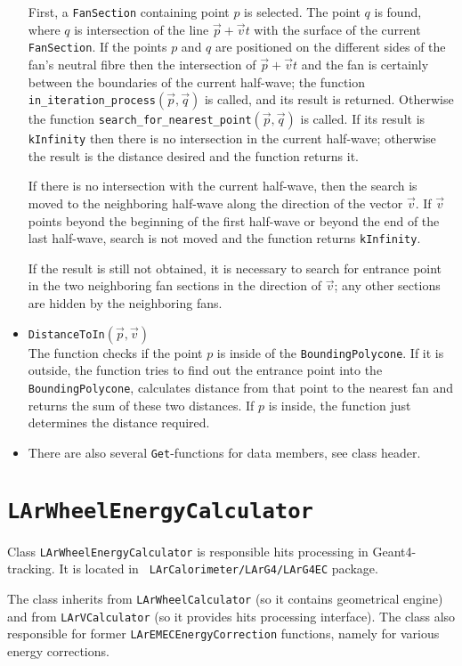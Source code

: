 \documentclass{article}
\begin{document}
\begin{itemize}
First, a {\tt FanSection} containing point $p$ is selected. The point $q$ is
found, where $q$ is intersection of the line $\vec{p}+\vec{v}t$ 
with the surface of the current {\tt FanSection}. If the points $p$
and $q$ are positioned on the different sides of the fan's neutral fibre
then the intersection of $\vec{p}+\vec{v}t$
and the fan is certainly between the
boundaries of the current half-wave; the function {\tt
in\_iteration\_process$(\vec{p}, \vec{q})$} is called, and its result is
returned. Otherwise the function {\tt search\_for\_nearest\_point$(\vec{p},
\vec{q})$} is called. If its result is {\tt kInfinity}
then there is no intersection
in the current half-wave; otherwise the result is the distance desired and the
function returns it.

If there is no intersection with the current half-wave, then the search is moved
to the neighboring half-wave along the direction of the vector $\vec{v}$. If
$\vec{v}$ points beyond the beginning of the first half-wave or beyond the end of
the last half-wave, search is not moved and the function returns {\tt kInfinity}.

If the result is still not obtained, it is necessary to search for entrance
point
in the two neighboring fan sections in the 
direction of $\vec{v}$; any other sections are hidden by
the neighboring fans.

\item {\tt DistanceToIn$(\vec{p}, \vec{v})$}\\
The function checks if the point $p$ is inside of the {\tt BoundingPolycone}.
If it is outside, the function tries to find out the entrance point into the
{\tt BoundingPolycone}, calculates distance from that point to the nearest fan
and returns the sum of these two distances.
If $p$ is inside, the function just determines the distance required.

\item There are also several {\tt Get}-functions for data members, see
class header.
\end{itemize}

\section{\tt LArWheelEnergyCalculator}
Class {\tt LArWheelEnergyCalculator} is responsible hits processing in
Geant4-tracking. It is located in {\tt
LArCalorimeter/LArG4/LArG4EC} package.

The class inherits from {\tt LArWheelCalculator} (so it contains geometrical
engine) and from {\tt LArVCalculator} (so it provides hits processing interface).
The class also responsible for former {\tt LArEMECEnergyCorrection} functions,
namely for various energy corrections.
\end{document}
